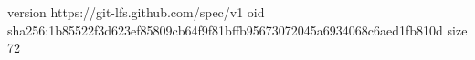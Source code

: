 version https://git-lfs.github.com/spec/v1
oid sha256:1b85522f3d623ef85809cb64f9f81bffb95673072045a6934068c6aed1fb810d
size 72
